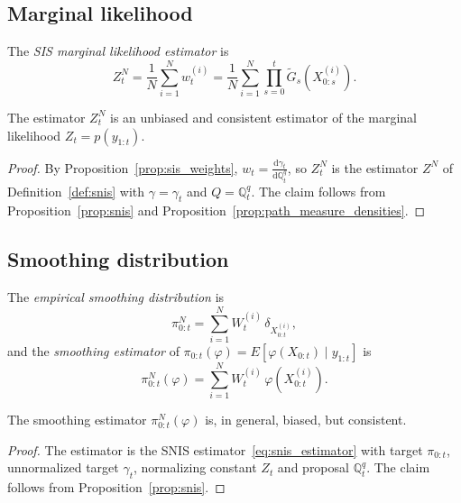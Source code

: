\subsection{Marginal likelihood}
\label{sec:sis_marginal_likelihood}
\begin{definition}
    \label{def:marginal_likelihood_estimator}
    The \emph{SIS marginal likelihood estimator} is
    \begin{equation}
        Z_t^N = \frac{1}{N}\sum_{i=1}^{N}w_t^{(i)} = \frac{1}{N}\sum_{i=1}^{N}\prod_{s=0}^{t}\tilde{G}_s(X_{0:s}^{(i)}).
        \label{eq:marginal_likelihood_estimator}
    \end{equation}
\end{definition}

\begin{proposition}
    \label{prop:marginal_likelihood_estimator}
    The estimator $Z_t^N$ is an unbiased and consistent estimator of the marginal likelihood $Z_t = p(y_{1:t})$.
\end{proposition}
\begin{proof}
    By Proposition~\ref{prop:sis_weights}, $w_t = \frac{\mathrm{d}\gamma_t}{\mathrm{d}\mathbb{Q}^q_t}$, so $Z_t^N$ is the estimator $Z^N$ of Definition~\ref{def:snis} with $\gamma=\gamma_t$ and $Q=\mathbb{Q}^q_t$. The claim follows from Proposition~\ref{prop:snis} and Proposition~\ref{prop:path_measure_densities}.
\end{proof}

\subsection{Smoothing distribution}
\label{sec:smoothing_distribution}
\begin{definition}
    \label{def:smoothing_estimator}
    The \emph{empirical smoothing distribution} is
    \begin{equation}
        \pi_{0:t}^N = \sum_{i=1}^{N}W_t^{(i)}\,\delta_{X_{0:t}^{(i)}},
        \label{eq:empirical_smoothing_distribution}
    \end{equation}
    and the \emph{smoothing estimator} of $\pi_{0:t}(\varphi) = E[\varphi(X_{0:t})\mid y_{1:t}]$ is
    \begin{equation}
        \pi_{0:t}^N(\varphi) = \sum_{i=1}^{N}W_t^{(i)}\,\varphi(X_{0:t}^{(i)}).
        \label{eq:smoothing_estimator}
    \end{equation}
\end{definition}

\begin{proposition}
    \label{prop:smoothing_estimator}
    The smoothing estimator $\pi_{0:t}^N(\varphi)$ is, in general, biased, but consistent.
\end{proposition}
\begin{proof}
    The estimator is the SNIS estimator~\eqref{eq:snis_estimator} with target $\pi_{0:t}$, unnormalized target $\gamma_t$, normalizing constant $Z_t$ and proposal $\mathbb{Q}^q_t$. The claim follows from Proposition~\ref{prop:snis}.
\end{proof}

